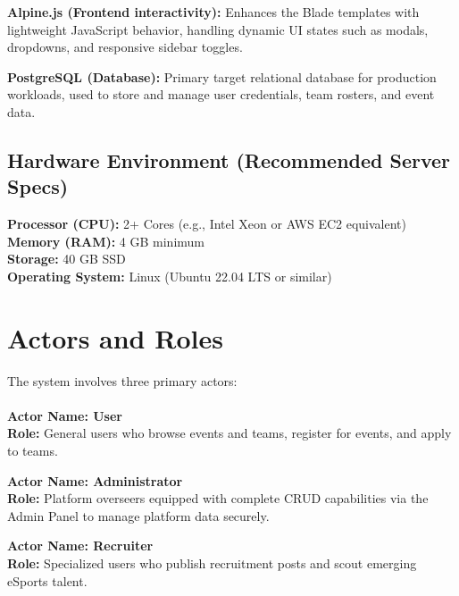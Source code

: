  \textbf{Alpine.js (Frontend interactivity):}
 Enhances the Blade templates with lightweight JavaScript behavior, handling dynamic UI states such as modals, dropdowns, and responsive sidebar toggles.

 \textbf{PostgreSQL (Database):}
 Primary target relational database for production workloads, used to store and manage user credentials, team rosters, and event data.
 
 \subsection{Hardware Environment (Recommended Server Specs)}
 \textbf{Processor (CPU):} 2+ Cores (e.g., Intel Xeon or AWS EC2 equivalent)\\
 \textbf{Memory (RAM):} 4 GB minimum\\
 \textbf{Storage:} 40 GB SSD\\
 \textbf{Operating System:} Linux (Ubuntu 22.04 LTS or similar)

 \newpage
 
 \section{Actors and Roles}
 The system involves three primary actors:\\\\
 \textbf{Actor Name: User}\\
 \textbf{Role:} General users who browse events and teams, register for events, and apply to teams.
 
 \textbf{Actor Name: Administrator}\\
 \textbf{Role:} Platform overseers equipped with complete CRUD capabilities via the Admin Panel to manage platform data securely.
 
 \textbf{Actor Name: Recruiter}\\
 \textbf{Role:} Specialized users who publish recruitment posts and scout emerging eSports talent.
